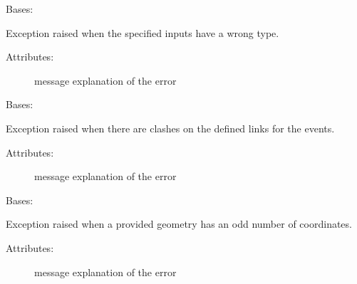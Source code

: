 
\begin{fulllineitems}
\label{\detokenize{eboa.engine:eboa.engine.errors.InputError}}
Bases: {\hyperref[\detokenize{eboa.engine:eboa.engine.errors.Error}]{}}

Exception raised when the specified inputs have a wrong type.
\begin{description}
\item[{Attributes:}] \leavevmode
message \textendash{} explanation of the error

\end{description}

\end{fulllineitems}


\begin{fulllineitems}
\label{\detokenize{eboa.engine:eboa.engine.errors.LinksInconsistency}}
Bases: {\hyperref[\detokenize{eboa.engine:eboa.engine.errors.Error}]{}}

Exception raised when there are clashes on the defined links for the events.
\begin{description}
\item[{Attributes:}] \leavevmode
message \textendash{} explanation of the error

\end{description}

\end{fulllineitems}


\begin{fulllineitems}
\label{\detokenize{eboa.engine:eboa.engine.errors.OddNumberOfCoordinates}}
Bases: {\hyperref[\detokenize{eboa.engine:eboa.engine.errors.Error}]{}}

Exception raised when a provided geometry has an odd number of coordinates.
\begin{description}
\item[{Attributes:}] \leavevmode
message \textendash{} explanation of the error

\end{description}

\end{fulllineitems}

